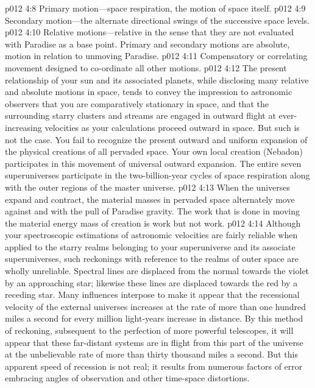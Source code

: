 \pc \vs p012 4:8 \bibnobreakspace Primary motion---space respiration, the motion of space itself.
\vs p012 4:9 \bibnobreakspace Secondary motion---the alternate directional swings of the successive space levels.
\vs p012 4:10 \bibnobreakspace Relative motions---relative in the sense that they are not evaluated with Paradise as a base point. Primary and secondary motions are absolute, motion in relation to unmoving Paradise.
\vs p012 4:11 \bibnobreakspace Compensatory or correlating movement designed to co\hyp{}ordinate all other motions.
\pc \vs p012 4:12 The present relationship of your sun and its associated planets, while disclosing many relative and absolute motions in space, tends to convey the impression to astronomic observers that you are comparatively stationary in space, and that the surrounding starry clusters and streams are engaged in outward flight at ever\hyp{}increasing velocities as your calculations proceed outward in space. But such is not the case. You fail to recognize the present outward and uniform expansion of the physical creations of all pervaded space. Your own local creation (Nebadon) participates in this movement of universal outward expansion. The entire seven superuniverses participate in the two\hyp{}billion\hyp{}year cycles of space respiration along with the outer regions of the master universe.
\vs p012 4:13 When the universes expand and contract, the material masses in pervaded space alternately move against and with the pull of Paradise gravity. The work that is done in moving the material energy mass of creation is  work but not  work.
\pc \vs p012 4:14 Although your spectroscopic estimations of astronomic velocities are fairly reliable when applied to the starry realms belonging to your superuniverse and its associate superuniverses, such reckonings with reference to the realms of outer space are wholly unreliable. Spectral lines are displaced from the normal towards the violet by an approaching star; likewise these lines are displaced towards the red by a receding star. Many influences interpose to make it appear that the recessional velocity of the external universes increases at the rate of more than one hundred miles a second for every million light\hyp{}years increase in distance. By this method of reckoning, subsequent to the perfection of more powerful telescopes, it will appear that these far\hyp{}distant systems are in flight from this part of the universe at the unbelievable rate of more than thirty thousand miles a second. But this apparent speed of recession is not real; it results from numerous factors of error embracing angles of observation and other time\hyp{}space distortions.\plusone
